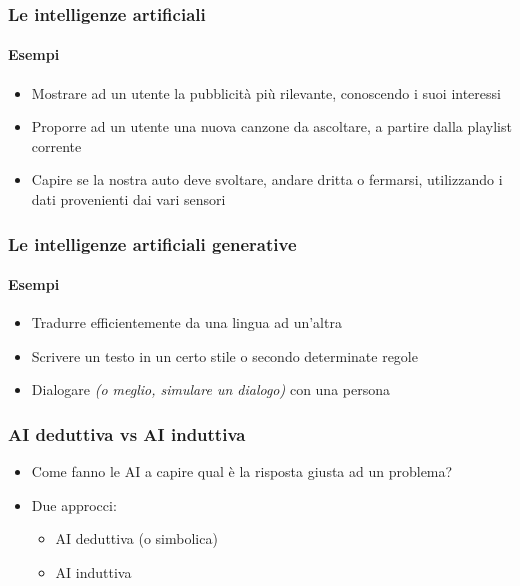 \begin{exampleframe}
    \frametitle{Le intelligenze artificiali}
    \framesubtitle{Esempi}

    \begin{itemize}
        \item Mostrare ad un utente la pubblicità più rilevante, conoscendo i suoi interessi

        \bigskip
        \item Proporre ad un utente una nuova canzone da ascoltare, a partire dalla playlist corrente

        \bigskip
        \item Capire se la nostra auto deve svoltare, andare dritta o fermarsi, utilizzando i dati provenienti dai vari sensori
    \end{itemize}
\end{exampleframe}

\begin{exampleframe}
    \frametitle{Le intelligenze artificiali generative}
    \framesubtitle{Esempi}

    \begin{itemize}
        \item Tradurre efficientemente da una lingua ad un'altra

        \bigskip
        \item Scrivere un testo in un certo stile o secondo determinate regole

        \bigskip
        \item Dialogare \textit{(o meglio, simulare un dialogo)} con una persona
    \end{itemize}
\end{exampleframe}

\begin{contentframe}
    \frametitle{AI deduttiva vs AI induttiva}

    \begin{itemize}
        \item Come fanno le AI a capire qual è la risposta giusta ad un problema?

        \bigskip
        \item Due approcci:
        \begin{itemize}
            \item AI deduttiva (o simbolica)
            \item AI induttiva
        \end{itemize}
    \end{itemize}
\end{contentframe}

